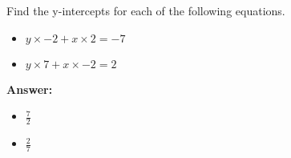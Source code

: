  Find the y-intercepts for each of the following equations. \begin{itemize}\item \( y \times -2 + x \times 2 = -7 \)\item \( y \times 7 + x \times -2 = 2 \)\end{itemize}

        \textbf{Answer:} \begin{itemize}\item \( \frac{7}{2} \)\item \( \frac{2}{7} \)\end{itemize}
